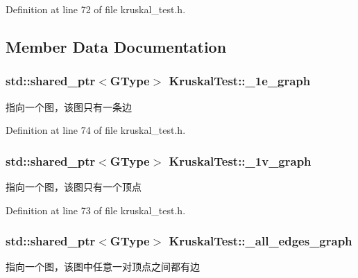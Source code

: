 Definition at line 72 of file kruskal\+\_\+test.\+h.



\subsection{Member Data Documentation}
\hypertarget{class_kruskal_test_ac4ef5fe84afa9d1774edd0f0d8e31e48}{}
\subsubsection[{\+\_\+1e\+\_\+graph}]{\setlength{\rightskip}{0pt plus 5cm}std\+::shared\+\_\+ptr$<${\bf G\+Type}$>$ Kruskal\+Test\+::\+\_\+1e\+\_\+graph\hspace{0.3cm}{\ttfamily [protected]}}\label{class_kruskal_test_ac4ef5fe84afa9d1774edd0f0d8e31e48}
指向一个图，该图只有一条边 

Definition at line 74 of file kruskal\+\_\+test.\+h.

\hypertarget{class_kruskal_test_a10424b1b5e9d63288d1751ee0e6115b4}{}
\subsubsection[{\+\_\+1v\+\_\+graph}]{\setlength{\rightskip}{0pt plus 5cm}std\+::shared\+\_\+ptr$<${\bf G\+Type}$>$ Kruskal\+Test\+::\+\_\+1v\+\_\+graph\hspace{0.3cm}{\ttfamily [protected]}}\label{class_kruskal_test_a10424b1b5e9d63288d1751ee0e6115b4}
指向一个图，该图只有一个顶点 

Definition at line 73 of file kruskal\+\_\+test.\+h.

\hypertarget{class_kruskal_test_a70183c9dedc39d09d71da4b3cecb59a4}{}
\subsubsection[{\+\_\+all\+\_\+edges\+\_\+graph}]{\setlength{\rightskip}{0pt plus 5cm}std\+::shared\+\_\+ptr$<${\bf G\+Type}$>$ Kruskal\+Test\+::\+\_\+all\+\_\+edges\+\_\+graph\hspace{0.3cm}{\ttfamily [protected]}}\label{class_kruskal_test_a70183c9dedc39d09d71da4b3cecb59a4}
指向一个图，该图中任意一对顶点之间都有边 

